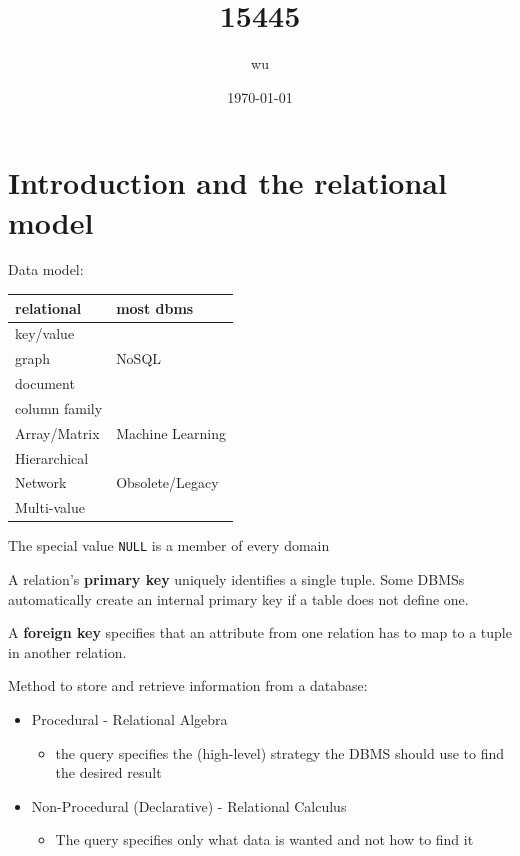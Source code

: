 \documentclass[11pt]{article}
\author{wu}
\date{\today}
\title{15445}
\begin{document}
\maketitle
\tableofcontents

\section{Introduction and the relational model}
\label{sec:org67156db}
Data model:

\begin{center}
\begin{tabular}{ll}
relational & most dbms\\
\hline
key/value & \\
graph & NoSQL\\
document & \\
column family & \\
\hline
Array/Matrix & Machine Learning\\
\hline
Hierarchical & \\
Network & Obsolete/Legacy\\
Multi-value & \\
\end{tabular}
\end{center}


The special value \texttt{NULL} is a member of every domain

A relation's \textbf{primary key} uniquely identifies a single tuple. Some DBMSs automatically create an
internal primary key if a table does not define one.

A \textbf{foreign key} specifies that an attribute from one relation has to map to a tuple in another
relation.

Method to store and retrieve information from a database:
\begin{itemize}
\item Procedural - Relational Algebra
\begin{itemize}
\item the query specifies the (high-level) strategy the DBMS should use to find the desired result
\end{itemize}
\item Non-Procedural (Declarative) - Relational Calculus
\begin{itemize}
\item The query specifies only what data is wanted and not how to find it
\end{itemize}
\end{itemize}
\end{document}
